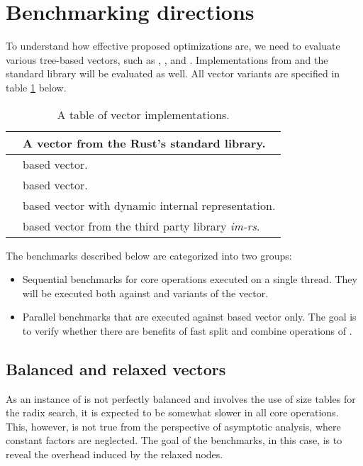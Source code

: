 \section{Benchmarking directions}
To understand how effective proposed optimizations are, we need to evaluate various tree-based vectors, such as \rbvec{}, \rrbvec{}, and \pvec{}. Implementations from \imrsvec{} and the standard library will be evaluated as well. All vector variants are specified in table \ref{tab:vec-implementations} below.

\begin{table}[!htbp]
    \centering

    \begin{tabular} { |l| p{11cm} | }
        \hline
        \stdvec{} & A vector from the Rust's standard library. \\ \hline
        \rbvec{} & \rbtree{} based vector. \\ \hline
        \rrbvec{} & \rrbtree{} based vector. \\ \hline
        \pvec{} & \rrbtree{} based vector with dynamic internal representation. \\ \hline
        \imrsvec{} & \rrbtree{} based vector from the third party library \emph{im-rs}\footnotemark{}. \\ \hline
    \end{tabular}

    \label{tab:vec-implementations}
    \caption{A table of vector implementations.}
\end{table}


The benchmarks described below are categorized into two groups:
\begin{itemize}
    \item Sequential benchmarks for core operations executed on a single thread. They will be executed both against \rc{} and \arc{} variants of the vector.
    \item Parallel benchmarks that are executed against \arc{} based vector only. The goal is to verify whether there are benefits of fast split and combine operations of \rrbvec{}.
\end{itemize}

\subsection{Balanced and relaxed vectors}
As an instance of \rrbtree{} is not perfectly balanced and involves the use of size tables for the radix search, it is expected to be somewhat slower in all core operations. This, however, is not true from the perspective of asymptotic analysis, where constant factors are neglected. The goal of the benchmarks, in this case, is to reveal the overhead induced by the relaxed nodes.

